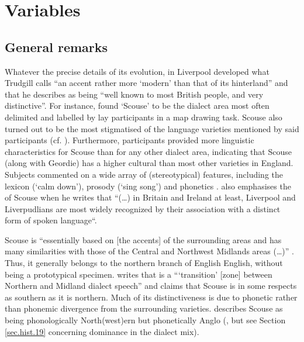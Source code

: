 \chapter{Variables}
\label{ch.var}

	\section{General remarks}\label{sec.var.general}

Whatever the precise details of its evolution, in Liverpool developed what Trudgill calls ``an accent rather more `modern' than that of its hinterland'' \citep[70]{trudgill1999} and that he describes as being ``well known to most British people, and very distinctive''.
For instance, \textcite{montgomery2007} found `Scouse' to be the dialect area most often delimited and labelled by lay participants in a map drawing task.
Scouse also turned out to be the most stigmatised of the language varieties mentioned by said participants (cf. \cite[194 and 254]{montgomery2007}).
Furthermore, participants provided more linguistic characteristics for Scouse than for any other dialect area, indicating that Scouse (along with Geordie) has a higher cultural  than most other varieties in England.
Subjects commented on a wide array of (stereotypical) features, including the lexicon (`calm down'), prosody (`sing song') and phonetics \citep[cf.][180--181]{montgomery2007a}.
\textcite[15]{crowley2012} also emphasises the  of Scouse when he writes that ``(\dots) in Britain and Ireland at least, Liverpool and Liverpudlians are most widely recognized by their association with a distinct form of spoken language``.

Scouse is ``essentially based on [the accents] of the surrounding areas and has many similarities with those of the Central  and Northwest Midlands areas (\dots)'' \citep[70]{trudgill1999}.
Thus, it generally belongs to the northern branch of English English, without being a prototypical specimen.
\citet[18]{wales2006} writes that  is a ```transition' [zone] between Northern and Midland dialect speech'' and \citet[72]{trudgill1999} claims that Scouse is in some respects as southern as it is northern.
Much of its distinctiveness is due to phonetic rather than phonemic divergence from the surrounding varieties. \textcite{knowles1973} describes Scouse as being phonologically North(west)ern but phonetically Anglo  (\citealt[cf. also][80]{knowles1978}, but see Section \ref{sec.hist.19} concerning  dominance in the dialect mix).

